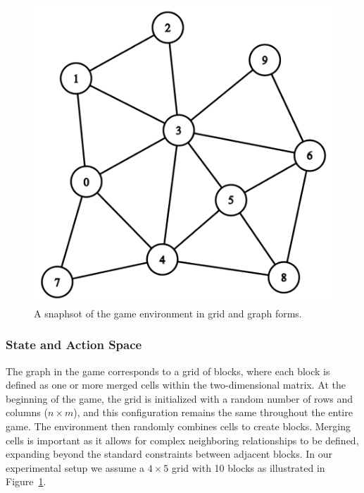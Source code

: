 \begin{flushleft}
\begin{figure}[h]
\begin{minipage}{0.46\linewidth}
        \end{minipage}
        \hfill
        \begin{minipage}{0.49\linewidth}
            \centering
            \includegraphics[width=\linewidth]{images/graph.png}
        \end{minipage}
        \caption{A snaphsot of the game environment in grid and graph forms.}
        \label{fig:grid_and_graph}
    \end{figure}

    \subsubsection{State and Action Space}

    \begin{flushleft}

        The graph in the game corresponds to a grid of blocks, where each block is defined as one or more merged cells within the two-dimensional matrix. At the beginning of the game, the grid is initialized with a random number of rows and columns ($n \times m$), and this configuration remains the same throughout the entire game. The environment then randomly combines cells to create blocks. Merging cells is important as it allows for complex neighboring relationships to be defined, expanding beyond the standard constraints between adjacent blocks. In our experimental setup we assume a $4 \times 5$ grid with 10 blocks as illustrated in Figure~\ref{fig:grid_and_graph}.\\~\\


\end{flushleft}
\end{flushleft}
